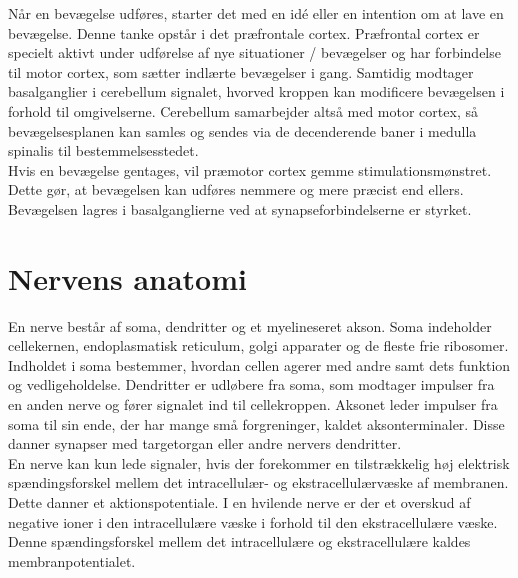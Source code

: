 Når en bevægelse udføres, starter det med en idé eller en intention om at lave en bevægelse. Denne tanke opstår i det præfrontale cortex. Præfrontal cortex er specielt aktivt under udførelse af nye situationer / bevægelser og har forbindelse til motor cortex, som sætter indlærte bevægelser i gang. Samtidig modtager basalganglier i cerebellum signalet, hvorved kroppen kan modificere bevægelsen i forhold til omgivelserne. Cerebellum samarbejder altså med motor cortex, så bevægelsesplanen kan samles og sendes via de decenderende baner i medulla spinalis til bestemmelsesstedet. \cite{Bojsen-Moeller2012} \\
Hvis en bevægelse gentages, vil præmotor cortex gemme stimulationsmønstret. Dette gør, at bevægelsen kan udføres nemmere og mere præcist end ellers. Bevægelsen lagres i basalganglierne ved at synapseforbindelserne er styrket. \cite{Martini2012}

\section{Nervens anatomi}
En nerve består af soma, dendritter og et myelineseret akson. Soma indeholder cellekernen, endoplasmatisk reticulum, golgi apparater og de fleste frie ribosomer. Indholdet i soma bestemmer, hvordan cellen agerer med andre samt dets funktion og vedligeholdelse. Dendritter er udløbere fra soma, som modtager impulser fra en anden nerve og fører signalet ind til cellekroppen. Aksonet leder impulser fra soma til sin ende, der har mange små forgreninger, kaldet aksonterminaler. Disse danner synapser med targetorgan eller andre nervers dendritter. \cite{Stanfield2014} \\
En nerve kan kun lede signaler, hvis der forekommer en tilstrækkelig høj elektrisk spændingsforskel mellem det intracellulær- og ekstracellulærvæske af membranen. Dette danner et aktionspotentiale. I en hvilende nerve er der et overskud af negative ioner i den intracellulære væske i forhold til den ekstracellulære væske. Denne spændingsforskel mellem det intracellulære og ekstracellulære kaldes membranpotentialet. \cite{Martini2012,Stanfield2014}

